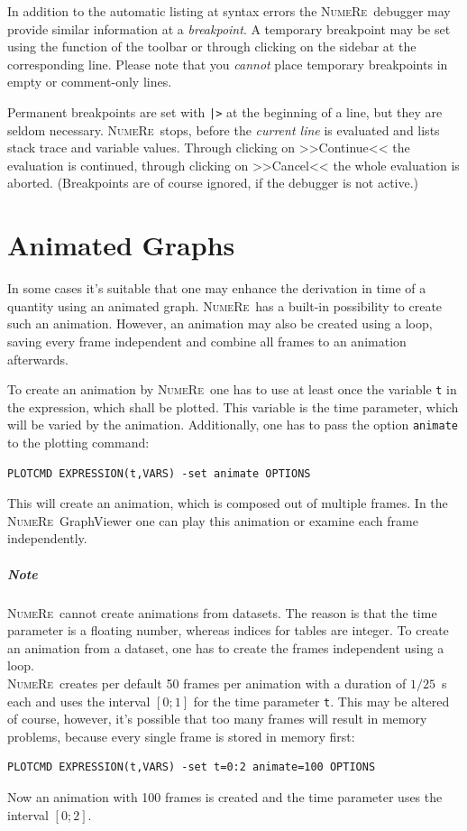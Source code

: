 \documentclass[DIV=14,headsepline,footsepline]{scrbook}
\newcommand{\NR}{\textsc{Nu\-me\-Re}}
\begin{document}
				In addition to the automatic listing at syntax errors the \NR\ debugger may provide similar information at a \emph{breakpoint}. A temporary breakpoint may be set using the function of the toolbar or through clicking on the sidebar at the corresponding line. Please note that you \emph{cannot} place temporary breakpoints in empty or comment-only lines.
				
				Permanent breakpoints are set with \lstinline+|>+ at the beginning of a line, but they are seldom necessary. \NR\ stops, before the \emph{current line} is evaluated and lists stack trace and variable values. Through clicking on >>Continue<< the evaluation is continued, through clicking on >>Cancel<< the whole evaluation is aborted. (Breakpoints are of course ignored, if the debugger is not active.)
				
		\chapter{Animated Graphs}
			In some cases it's suitable that one may enhance the derivation in time of a quantity using an animated graph. \NR\ has a built-in possibility to create such an animation. However, an animation may also be created using a loop, saving every frame independent and combine all frames to an animation afterwards.
			
			To create an animation by \NR\ one has to use at least once the variable \lstinline+t+ in the expression, which shall be plotted. This variable is the time parameter, which will be varied by the animation. Additionally, one has to pass the option \lstinline+animate+ to the plotting command:
			\begin{lstlisting}
PLOTCMD EXPRESSION(t,VARS) -set animate OPTIONS
			\end{lstlisting}
			This will create an animation, which is composed out of multiple frames. In the \NR\ Graph\-Viewer one can play this animation or examine each frame independently.
			
			\paragraph{Note}
				\NR\ cannot create animations from datasets. The reason is that the time parameter is a floating number, whereas indices for tables are integer. To create an animation from a dataset, one has to create the frames independent using a loop.\bigskip\\
			\NR\ creates per default 50 frames per animation with a duration of $1/25$~s each and uses the interval $[0;1]$ for the time parameter \lstinline+t+. This may be altered of course, however, it's possible that too many frames will result in memory problems, because every single frame is stored in memory first:
			\begin{lstlisting}
PLOTCMD EXPRESSION(t,VARS) -set t=0:2 animate=100 OPTIONS
			\end{lstlisting}
			Now an animation with 100 frames is created and the time parameter uses the interval $[0;2]$.
\end{document}
